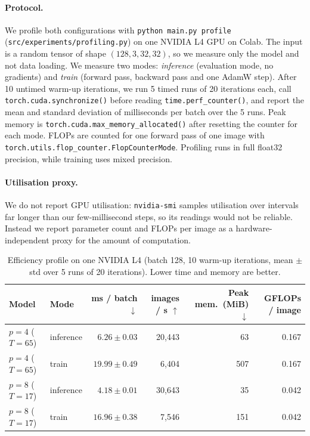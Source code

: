 \documentclass{article}
\begin{document}
\paragraph{Protocol.}
We profile both configurations with \texttt{python main.py profile}
(\texttt{src/experiments/profiling.py}) on one NVIDIA L4 GPU on Colab.
The input is a random tensor of shape $(128, 3, 32, 32)$, so we measure only
the model and not data loading. We measure two modes: \emph{inference}
(evaluation mode, no gradients) and \emph{train} (forward pass, backward
pass and one AdamW step). After 10 untimed warm-up iterations, we run 5
timed runs of 20 iterations each, call \texttt{torch.cuda.synchronize()}
before reading \texttt{time.perf\_counter()}, and report the mean and
standard deviation of milliseconds per batch over the 5 runs. Peak memory
is \texttt{torch.cuda.max\_memory\_allocated()} after resetting the counter
for each mode. FLOPs are counted for one forward pass of one image with
\texttt{torch.utils.flop\_counter.FlopCounterMode}. Profiling runs in
full float32 precision, while training uses mixed precision.

\paragraph{Utilisation proxy.}
We do not report GPU utilisation: \texttt{nvidia-smi} samples utilisation
over intervals far longer than our few-millisecond steps, so its readings
would not be reliable. Instead we report parameter count and FLOPs per
image as a hardware-independent proxy for the amount of computation.

\begin{table}[h]
  \caption{Efficiency profile on one NVIDIA L4 (batch 128, 10 warm-up
  iterations, mean $\pm$ std over 5 runs of 20 iterations). Lower time and
  memory are better.}
  \label{tab:efficiency}
  \centering
  \small
  \begin{tabular}{llrrrr}
    \toprule
    Model & Mode & ms / batch $\downarrow$ & images / s $\uparrow$ & Peak mem.\ (MiB) $\downarrow$ & GFLOPs / image \\
    \midrule
    $p{=}4$ ($T{=}65$) & inference & $6.26 \pm 0.03$ & 20{,}443 & 63 & 0.167 \\
    $p{=}4$ ($T{=}65$) & train     & $19.99 \pm 0.49$ & 6{,}404 & 507 & 0.167 \\
    $p{=}8$ ($T{=}17$) & inference & $4.18 \pm 0.01$ & 30{,}643 & 35 & 0.042 \\
    $p{=}8$ ($T{=}17$) & train     & $16.96 \pm 0.38$ & 7{,}546 & 151 & 0.042 \\
    \bottomrule
  \end{tabular}
\end{table}
\end{document}
